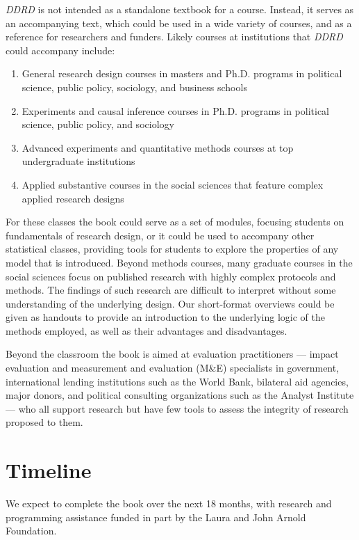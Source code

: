 \documentclass[11pt]{article}
\begin{document}
\textit{DDRD} is not intended as a standalone textbook for a course. Instead, it serves as an accompanying text, which could be used in a wide variety of courses, and as a reference for researchers and funders. Likely courses at institutions that \textit{DDRD} could accompany include:

\begin{enumerate}
\item General research design courses in masters and Ph.D. programs in political science, public policy, sociology, and business schools
\item Experiments and causal inference courses in Ph.D. programs in political science, public policy, and sociology
\item Advanced experiments and quantitative methods courses at top undergraduate institutions
\item Applied substantive courses in the social sciences that feature complex applied research designs
\end{enumerate}

For these classes the book could serve as a set of modules, focusing students on fundamentals of research design, or it could be used to accompany other statistical classes, providing tools for students to explore the properties of any model that is introduced. Beyond methods courses, many graduate courses in the social sciences focus on published research with highly complex protocols and methods. The findings of such research are difficult to interpret without some understanding of the underlying design. Our short-format overviews could be given as handouts to provide an introduction to the underlying logic of the methods employed, as well as their advantages and disadvantages. 

Beyond the classroom the book is aimed at evaluation practitioners --- impact evaluation and measurement and evaluation (M\&E) specialists in government, international lending institutions such as the World Bank, bilateral aid agencies, major donors, and political consulting organizations such as the Analyst Institute ---  who all support research but have few tools to assess the integrity of research proposed to them.


\section{Timeline}

We expect to complete the book over the next 18 months, with research and programming assistance funded in part by the Laura and John Arnold Foundation.
\end{document}
